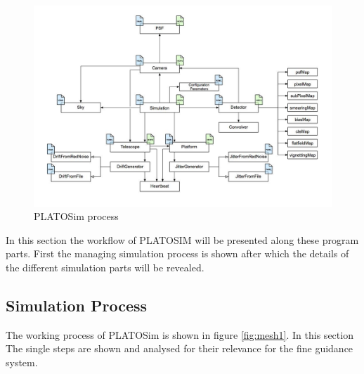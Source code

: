 \begin{figure}[h]
	\centering
	\includegraphics[width=\textwidth]{PLATOSim_design.jpg}
	\caption{PLATOSim process}
	\label{fig:mesh3}
\end{figure}

In this section the workflow of PLATOSIM will be presented along these program parts. First the managing simulation process is shown after which the details of the different simulation parts will be revealed.   
\subsection{Simulation Process}  
The working process of PLATOSim is shown in figure \ref{fig:mesh1}. In this section The single steps are shown and analysed for their relevance for the fine guidance system.

